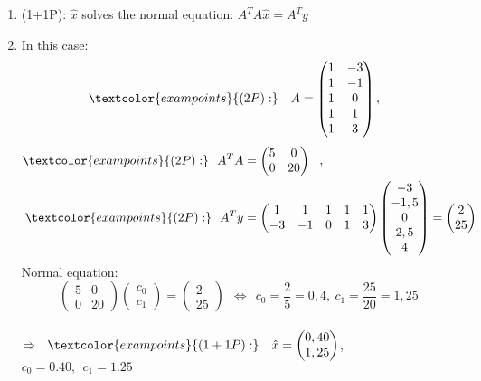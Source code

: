 {\color{solution}
\begin{enumerate}
	\item \textcolor{exampoints}{(1+1P)}: $\hat{x}$ solves the normal equation: $A^TA\hat{x}=A^Ty$
	\item In this case: 
	$$\textcolor{exampoints}{(2P):}~~~A=\begin{pmatrix}1&-3\\1&-1\\1&0\\1&1\\1&3\end{pmatrix},~~$$
	\begin{align*}
	\textcolor{exampoints}{(2P):}~~A^TA&=\begin{pmatrix}5&0\\0&20\end{pmatrix}~~,\\
	\textcolor{exampoints}{(2P):}~~A^Ty&=\begin{pmatrix}1&1&1&1&1\\-3&-1&0&1&3\end{pmatrix}
	\begin{pmatrix}-3\\-1,5\\0\\2,5\\4\end{pmatrix}
	=\begin{pmatrix}2\\25\end{pmatrix}
	\end{align*}
	Normal equation: $$\begin{pmatrix}5&0\\0&20\end{pmatrix}
	\begin{pmatrix}c_0\\c_1\end{pmatrix}
	=\begin{pmatrix}2\\25\end{pmatrix}
	~~\Leftrightarrow~~c_0=\frac{2}{5}=0,4,~c_1=\frac{25}{20}=1,25$$\\
	$\Rightarrow~~\textcolor{exampoints}{(1+1P):}~~~\hat{x}=
	\begin{pmatrix}0,40\\1,25\end{pmatrix}$,~~~$c_0=0.40,~~ c_1=1.25$
\end{enumerate}
}